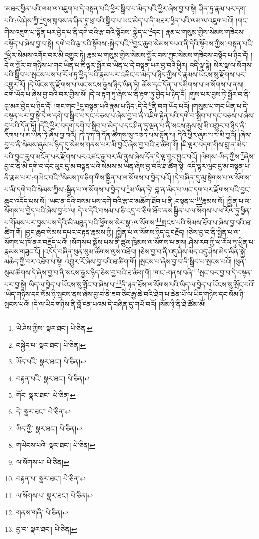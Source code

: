 །མཐར་ཕྱིན་པའི་ལམ་ལ་འཇུག་པ་དེ་བསྟན་པའི་ཕྱིར་སྒྲིབ་པ་མེད་པའི་ཕྱིར་ཞེས་བྱ་བ་སྟེ། ཤིན་ཏུ་རྣམ་པར་དག་པའི་:ཡེ་ཤེས་ཀྱི་\footnote{ཡེ་ཤེས་ཀྱིས་  སྣར་ཐང་།  པེ་ཅིན། }དུས་སྐབས་ན་ཤིན་ཏུ་ཕྲ་བའི་སྒྲིབ་པ་ཡང་མེད་པ་ནི་མཐར་ཕྱིན་པའི་ལམ་ལ་འཇུག་པའོ། །གང་གིས་འཇུག་པ་སྟོན་པར་བྱེད་པ་ནི་དགེ་བའི་རྩ་བའི་སྟོབས་:སྐྱེད་པ་\footnote{བསྐྱེད་པ་  སྣར་ཐང་།  པེ་ཅིན། }དང་། རྣམ་པ་གསུམ་གྱིས་སེམས་གཟེངས་བསྟོད་པ་ཞེས་བྱ་བ་སྟེ། དགེ་བའི་རྩ་བའི་སྟོབས་:སྐྱེད་པའི་\footnote{ཡོད་པའི་  སྣར་ཐང་།  པེ་ཅིན། }བྱང་ཆུབ་སེམས་དཔའ་ནི་དེའི་སྟོབས་ཀྱིས་:བསྟན་པའི་\footnote{བརྟན་པའི་  སྣར་ཐང་།  པེ་ཅིན། }ཕྱིར་སེམས་འགོང་བར་མི་འགྱུར་ཏེ། རྣམ་པ་གསུམ་གྱིས་སེམས་སྦྱོར་བས་ཀྱང་སེམས་གཟེངས་བསྟོད་པ་ཉིད་དོ། །དེ་ལ་སྦྱོར་བ་གཉིས་པ་གང་ཡིན་པ་ཇི་ལྟར་སྦྱོར་བ་ཡིན་པ་དེ་བསྟན་པར་བྱ་བའི་ཕྱིར། འདི་ལྟ་སྟེ། སེར་སྣ་ལ་སོགས་པའི་སྒྲིབ་པ་སྤངས་པས་ཕ་རོལ་ཏུ་ཕྱིན་པའི་རྣམ་པར་འཆིང་བ་མེད་པ་ཉིད་ཀྱིས་དེ་རྣམས་ཡོངས་སུ་རྫོགས་པར་འགྱུར་རོ། །དེ་ཡོངས་སུ་རྫོགས་པ་ཡང་སངས་རྒྱས་ཉིད་ཡིན་ཏེ། ཆོས་དང་དོན་ལ་དམིགས་པ་ལ་སོགས་པ་ནས། བག་ཡོད་པ་ཞེས་བྱ་བའི་བར་གྱིས་སོ། །དེ་ལ་རྟག་ཏུ་ཞེས་པ་ནི་རྟག་ཏུ་བྱེད་པ་ཉིད་དོ། །གུས་པར་བྱས་ཏེ་སྦྱོར་བ་ནི་བླ་མར་བྱེད་པ་ཉིད་དོ། །གང་གང་\footnote{གོང་  སྣར་ཐང་།  པེ་ཅིན། }དུ་བསྟན་པའི་རྣམ་པ་ཉིད་:དེ་དེ་\footnote{དེ་  སྣར་ཐང་།  པེ་ཅིན། }ནི་བག་ཡོད་པའོ། །གསུམ་པ་གང་ཡིན་པ་དེ་བསྟན་པར་བྱ་སྟེ་དེ་ལ་དགེ་བ་སྒྲིབ་པ་དང་བཅས་པ་ཞེས་བྱ་བ་ནི་འཇིག་རྟེན་པའི་དགེ་བ་སྒྲིབ་པ་དང་བཅས་པ་ཞེས་བྱ་བའི་དོན་ཏོ། །དེའི་ཕྱིར་བདག་དགེ་བ་སྒྲིབ་པ་མེད་པ་དང་ཤིན་ཏུ་ལྡན་པ་ནི་སངས་རྒྱས་སུ་མི་འགྱུར་བ་ཉིད་ནི་རིགས་པ་མ་ཡིན་ཏེ་ཞེས་བྱ་བའོ། །དེ་དག་གི་དོན་ཚིགས་སུ་བཅད་པས་སྟོན་པ། དེའི་ཕྱིར་ཞུམ་པར་མི་བྱའོ། །ཞེས་བྱ་བ་ནི་སེམས་ཞུམ་པ་ཉིད་དུ་སེམས་གནས་པར་མི་བྱའོ་ཞེས་བྱ་བའི་ཐ་ཚིག་གོ། །ཇི་ལྟར་བདག་གིས་བླ་ན་མེད་པའི་བྱང་ཆུབ་མངོན་པར་རྫོགས་པར་འཚང་རྒྱ་བར་མི་ནུས་ཞེས་དོན་དེ་ལྟ་བུར་བྱུང་བའོ། །ལེགས་:ཡིད་ཀྱིས་\footnote{ཡིད་ཀྱི་  སྣར་ཐང་།  པེ་ཅིན། }ཞེས་བྱ་བ་ནི་མི་དགེ་བ་དང་ལུང་དུ་མ་བསྟན་པའི་སེམས་མ་ཡིན་ཞེས་བྱ་བའི་ཐ་ཚིག་སྟེ། འདི་ལྟར་ལུང་དུ་མ་བསྟན་པ་ནི་རྣམ་པར་:གཡེང་བའི་\footnote{གཡེངས་པའི་  སྣར་ཐང་།  པེ་ཅིན། }སེམས་ཁ་ཅིག་གིས་སྦྱིན་པ་ལ་སོགས་པ་བྱེད་པའོ། །དེ་བཞིན་དུ་མུ་སྟེགས་པ་ལ་སོགས་པ་མི་དགེ་བའི་སེམས་ཀྱིས་:སྦྱིན་པ་ལ་སོགས་པ་བྱེད་པ་\footnote{ལ་སོགས་པ་  པེ་ཅིན། }མ་ཡིན་ཏེ། བླ་ན་མེད་པ་ཡང་དག་པར་རྫོགས་པའི་བྱང་ཆུབ་འདོད་པས་སོ། །ཡང་ན་དེའི་བསམ་པས་དགེ་བའི་རྩ་བ་མཆོག་ཐོབ་པ་ནི་:བསྟན་པ་\footnote{བརྟན་པ་  སྣར་ཐང་།  པེ་ཅིན། }རྣམས་སོ། །སྦྱིན་པ་ལ་སོགས་པ་བྱེད་པའི་ཞེས་བྱ་བ་ལ། དེ་ལ་དེའི་བསམ་པ་ཅི་འདྲ་བ་ཅིག་ཐོབ་ནས་སྦྱིན་པ་ལ་སོགས་པ་ཕ་རོལ་ཏུ་ཕྱིན་པ་གོམས་པར་བྱས་པས་དེའི་མི་མཐུན་པའི་ཕྱོགས་སེར་སྣ་:ལ་སོགས་\footnote{ལ་སོགས་པ་  སྣར་ཐང་།  པེ་ཅིན། }སྤངས་པའི་སེམས་ཐོབ་པ་ཞེས་བྱ་བའི་ཐ་ཚིག་གོ། །བྱང་ཆུབ་སེམས་དཔའ་བརྟན་རྣམས་ཀྱི། །སྦྱིན་པ་ལ་སོགས་ཉིད་དུ་བརྗོད། །ཅེས་བྱ་བ་ནི་སྦྱིན་པ་ལ་སོགས་པ་ཁོ་ནར་བརྗོད་པའོ། །སོགས་པ་སྨོས་པས་ནི་ཚུལ་ཁྲིམས་ལ་སོགས་པ་ནས། ཤེས་རབ་ཀྱི་ཕ་རོལ་ཏུ་ཕྱིན་པ་རྣམས་གཟུང་ངོ། །འདོད་བཞིན་ཕུན་སུམ་ཚོགས་ལུས་འཐོབ། །ཅེས་བྱ་བ་ནི་འདུ་ཤེས་མེད་འདུ་ཤེས་མེད་མིན་སྐྱེ་མཆེད་ཀྱི་བར་འཐོབ་པ་སྟེ། འགྱུར་རོ་ཞེས་བྱ་བའི་ཐ་ཚིག་གོ། །སྤངས་པ་ཞེས་བྱ་བ་ནི་སྒྲིབ་པ་སྤངས་པའོ། །ཕུན་སུམ་ཚོགས་དེ་ཞེས་བྱ་བ་ནི་སངས་རྒྱས་ཉིད་ཅེས་བྱ་བའི་ཐ་ཚིག་གོ། །གང་:གནས་བཞི་\footnote{གནས་གཞི་  པེ་ཅིན། }སྤང་བར་བྱ་བ་དེ་བསྟན་པར་བྱ་སྟེ། ཡིད་ལ་བྱེད་པ་ཡོངས་སུ་སྤོང་བ་ཞེས་པ་\footnote{བྱ་བ་  སྣར་ཐང་།  པེ་ཅིན། }ནི་ཉན་ཐོས་ལ་སོགས་པའི་ཡིད་ལ་བྱེད་པ་ཡོངས་སུ་སྤོང་བའོ། །ཡིད་གཉིས་དང་སོམ་ཉི་སྤངས་ནས་ཞེས་བྱ་བ་ནི་ཟབ་ཅིང་རྒྱ་ཆེ་བའི་ཐེག་པ་ཆེན་པོ་ལ་ཡིད་གཉིས་དང་སོམ་ཉི་སྤངས་པའོ། །དེ་ལ་ཡིད་གཉིས་ནི་བློ་ངན་པའམ་དེ་བཞིན་དུ་གཡོ་བའོ། །སོམ་ཉི་ནི་ཐེ་ཚོམ་མོ། 